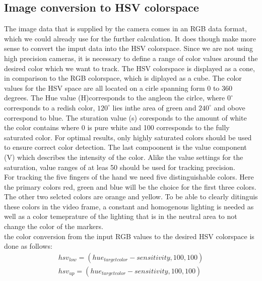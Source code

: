 \subsection{Image conversion to HSV colorspace}
The image data that is supplied by the camera comes in an RGB data format, which we could already use for the further calculation. It does though make more sense to convert the imput data into the HSV colorspace. Since we are not using high precision cameras, it is necessary to define a range of color values around the desired color which we want to track. The HSV colorspace is displayed as a cone, in comparison to the RGB colorspace, which is diplayed as a cube. The color values for the HSV space are all located on a cirle spanning form 0 to 360 degrees. The Hue value (H)corresponds to the angleon the cirlce, where $0^\circ$ corresponds to a redish color, $120^\circ$ lies inthe area of green and $240^\circ$ and obove correspond to blue. The sturation value (s) coresponds to the amount of white the color contains  where 0 is pure white and 100 corresponds to the fully saturated color. For optimal results, only highly saturated colors should be used to ensure correct color detection. The last compoonent is the value component (V) which describes the intensity of the color. Alike the value settings for the saturation, value ranges of at leas 50 should be used for tracking precision.
\\
For tracking the five fingers of the hand we need five distinguishable colors. Here the primary colors red, green and blue will be the choice for the first three colors. The other two selcted colors  are orange and yellow. To be able to clearly ditinguis these colors in the video frame, a constant and homogenous lighting is needed as well as a color temeprature of the lighting that is in the neutral area to not change the color of the markers.
\\the color conversion from the input RGB values to the desired HSV colorspace is done as follows:
\begin{equation}
\begin{split}
hsv_{low}=(hue_{targetcolor}-sensitivity,100,100)\\
hsv_{up}=(hue_{targetcolor}-sensitivity,100,100)\\
\end{split}
\end{equation}
